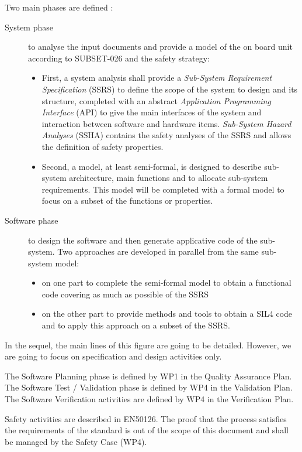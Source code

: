 Two main phases are defined :
\begin{description}
\item[System phase] to analyse the input documents and provide a model of the on
  board unit according to SUBSET-026 and the safety strategy:
\begin{itemize}
\item First, a system analysis shall provide a \textit{Sub-System Requirement Specification} (SSRS) to define the scope of the system to  design and its structure, completed with an abstract \textit{Application Programming Interface} (API) to  give the main interfaces of the system and interaction between software and hardware items. \textit{Sub-System Hazard Analyses} (SSHA) contains the safety analyses of the SSRS and  allows the definition of safety properties.
\item Second, a model, at least semi-formal, is designed to describe sub-system
  architecture, main functions and to allocate sub-system requirements. This
  model will be completed with a formal model to focus on a subset of the
  functions or properties.
\end{itemize}
\item[Software phase] to design the software and then generate applicative code
  of the sub-system. Two approaches are developed in parallel from the same
  sub-system model:
\begin{itemize}
\item on one part to complete the semi-formal model to obtain a functional code covering as much as possible of the SSRS
\item on the other part to provide methods and tools to  obtain a SIL4 code and to apply this approach on a subset of the SSRS.
\end{itemize}
\end{description} 

In the sequel, the main lines of this figure are going to be detailed. However, we are going to focus on specification and design activities only.

The Software Planning phase is defined by WP1 in the Quality Assurance Plan.
The Software Test / Validation phase is defined by WP4 in the Validation Plan.
The Software Verification activities are defined by WP4 in the Verification Plan.

Safety activities are described in EN50126.
The proof that the process satisfies the requirements of the standard is out of the scope of this document and shall be managed by the Safety Case (WP4).



